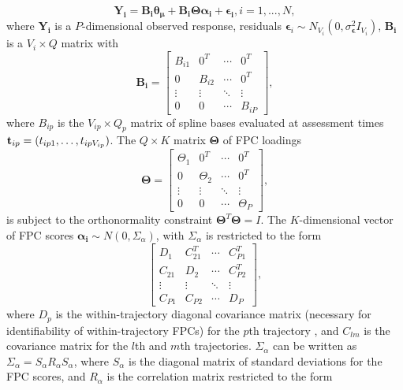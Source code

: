\documentclass[aoas,preprint]{imsart}
\begin{document}
\begin{equation}
\boldsymbol{Y_i} = \boldsymbol{B_i \theta_\mu} + \boldsymbol{B_i \Theta \alpha_i} + \boldsymbol{\epsilon_i}, i = 1, ..., N,
\label{eq:mSFPCA}
\end{equation}
where $\boldsymbol{Y_i}$ is a $P$-dimensional observed response,  residuals $\boldsymbol\epsilon_i \sim N_{V_i} (0, \sigma_{\boldsymbol\epsilon}^2 I_{V_i})$, 
$\boldsymbol{B_i}$ is a $V_i \times Q$ matrix with
\begin{equation*}
\boldsymbol{B_i} = 
\begin{bmatrix}
B_{i1} & 0^T & \cdots  & 0^T \\
0 & B_{i2} & \cdots  & 0^T \\
\vdots & \vdots & \ddots & \vdots \\
0 & 0 & \cdots & B_{iP}
\end{bmatrix},
\end{equation*}
where $B_{ip}$ is the $V_{ip} \times Q_p$ matrix of spline bases evaluated at assessment times ${\bf t}_{ip} = (t_{ip1},\ldots, t_{ipV_{ip}})$.
The $Q \times K$ matrix $\boldsymbol{\Theta}$ of FPC loadings
\begin{equation*}
\boldsymbol{\Theta} = 
\begin{bmatrix}
\Theta_1 & 0^T & \cdots & 0^T \\
0 & \Theta_2 & \cdots  & 0^T \\
\vdots & \vdots & \ddots & \vdots \\
0 & 0 & \cdots & \Theta_P
\end{bmatrix},
\end{equation*}
is subject to the orthonormality constraint $\boldsymbol \Theta^T \boldsymbol \Theta = I$.
The $K$-dimensional vector of FPC scores $\boldsymbol{\alpha_i} \sim N(0, \Sigma_\alpha)$, with $ \Sigma_\alpha$ is restricted to the form 
\begin{equation*}
\begin{bmatrix}
D_1 & C_{21}^T & \cdots & C_{P1}^T \\
C_{21} & D_2 & \cdots  & C_{P2}^T \\
\vdots & \vdots & \ddots & \vdots \\
C_{P1} & C_{P2} & \cdots & D_P
\end{bmatrix},
\end{equation*}
where $D_p$ is the within-trajectory diagonal covariance matrix (necessary for identifiability of within-trajectory FPCs) for the $p$th trajectory , and $C_{lm}$ is the covariance matrix for the $l$th and $m$th trajectories.
$ \Sigma_\alpha$ can be written as $ \Sigma_\alpha= S_\alpha R_\alpha S_\alpha$, where $S_\alpha$ is the diagonal matrix of standard deviations for the FPC scores,  and $R_\alpha$ is the correlation matrix restricted to the form
\end{document}
